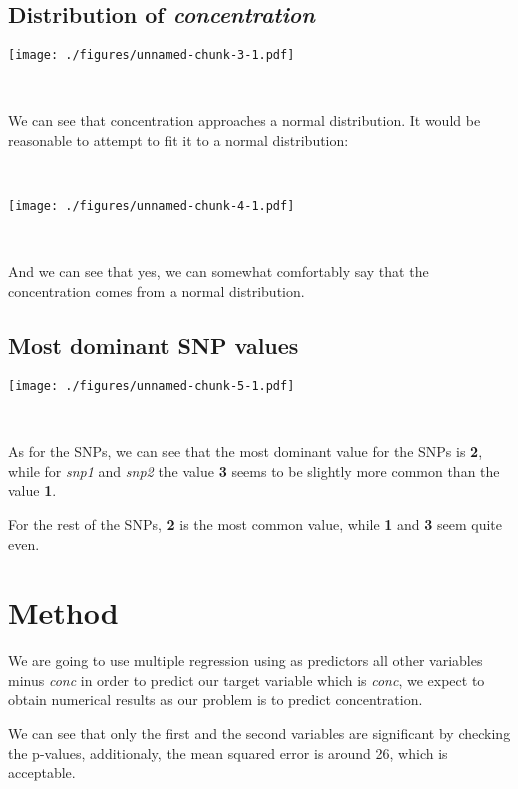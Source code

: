 \documentclass[]{article}
\begin{document}
\hypertarget{distribution-of-concentration}{%
\subsection{\texorpdfstring{Distribution of
\emph{concentration}}{Distribution of concentration}}\label{distribution-of-concentration}}

\texttt{[image: ./figures/unnamed-chunk-3-1.pdf]}

~

We can see that concentration approaches a normal distribution. It would
be reasonable to attempt to fit it to a normal distribution:

~

\texttt{[image: ./figures/unnamed-chunk-4-1.pdf]}

~

And we can see that yes, we can somewhat comfortably say that the
concentration comes from a normal distribution.

\hypertarget{most-dominant-snp-values}{%
\subsection{Most dominant SNP values}\label{most-dominant-snp-values}}

\texttt{[image: ./figures/unnamed-chunk-5-1.pdf]}

~

As for the SNPs, we can see that the most dominant value for the SNPs is
\textbf{2}, while for \emph{snp1} and \emph{snp2} the value \textbf{3}
seems to be slightly more common than the value \textbf{1}.

For the rest of the SNPs, \textbf{2} is the most common value, while
\textbf{1} and \textbf{3} seem quite even.

\newpage

\hypertarget{method}{%
\section{Method}\label{method}}

We are going to use multiple regression using as predictors all other
variables minus \emph{conc} in order to predict our target variable
which is \emph{conc}, we expect to obtain numerical results as our
problem is to predict concentration.

We can see that only the first and the second variables are significant
by checking the p-values, additionaly, the mean squared error is around
26, which is acceptable.
\end{document}
